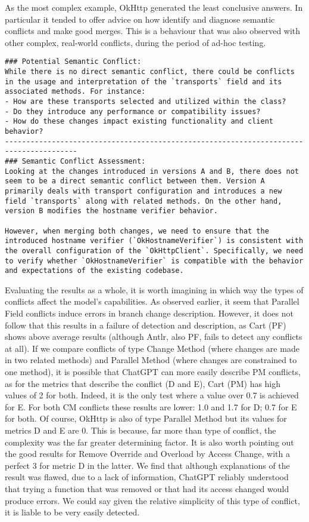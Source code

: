 As the most complex example, OkHttp generated the least conclusive answers. In particular it tended to offer advice on how identify and diagnose semantic conflicts and make good merges. This is a behaviour that was also observed with other complex, real-world conflicts, during the period of ad-hoc testing.
\begin{lstlisting}
### Potential Semantic Conflict:
While there is no direct semantic conflict, there could be conflicts in the usage and interpretation of the `transports` field and its associated methods. For instance:
- How are these transports selected and utilized within the class?
- Do they introduce any performance or compatibility issues?
- How do these changes impact existing functionality and client behavior?
---------------------------------------------------------------------------------------
### Semantic Conflict Assessment:
Looking at the changes introduced in versions A and B, there does not seem to be a direct semantic conflict between them. Version A primarily deals with transport configuration and introduces a new field `transports` along with related methods. On the other hand, version B modifies the hostname verifier behavior.

However, when merging both changes, we need to ensure that the introduced hostname verifier (`OkHostnameVerifier`) is consistent with the overall configuration of the `OkHttpClient`. Specifically, we need to verify whether `OkHostnameVerifier` is compatible with the behavior and expectations of the existing codebase.
\end{lstlisting}

Evaluating the results as a whole, it is worth imagining in which way the types of conflicts affect the model's capabilities. As observed earlier, it seem that Parallel Field conflicts induce errors in branch change description. However, it does not follow that this results in a failure of detection and description, as Cart (PF) shows above average results (although Antlr, also PF, fails to detect any conflicts at all). 
If we compare conflicts of type Change Method (where changes are made in two related methods) and Parallel Method (where changes are constrained to one method), it is possible that ChatGPT can more easily describe PM conflicts, as for the metrics that describe the conflict (D and E), Cart (PM) has high values of 2 for both. Indeed, it is the only test where a value over 0.7 is achieved for E. For both CM conflicts these results are lower: 1.0 and 1.7 for D; 0.7 for E for both.
Of course, OkHttp is also of type Parallel Method but its values for metrics D and E are 0. This is because, far more than type of conflict, the complexity was the far greater determining factor.
It is also worth pointing out the good results for Remove Override and Overload by Access Change, with a perfect 3 for metric D in the latter. We find that although explanations of the result was flawed, due to a lack of information, ChatGPT reliably understood that trying a function that was removed or that had its access changed would produce errors. We could say given the relative simplicity of this type of conflict, it is liable to be very easily detected.

